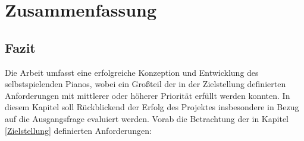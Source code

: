 
\chapter{Zusammenfassung} \label{fazit}

\section{Fazit}
Die Arbeit umfasst eine erfolgreiche Konzeption und Entwicklung des selbstspielenden Pianos, wobei ein Großteil der in der Zielstellung
definierten Anforderungen mit mittlerer oder höherer Priorität erfüllt werden konnten. In diesem Kapitel soll Rückblickend der Erfolg
des Projektes insbesondere in Bezug auf die Ausgangsfrage evaluiert werden.
\newline
Vorab die Betrachtung der in Kapitel \ref{Zielstellung} definierten Anforderungen:
